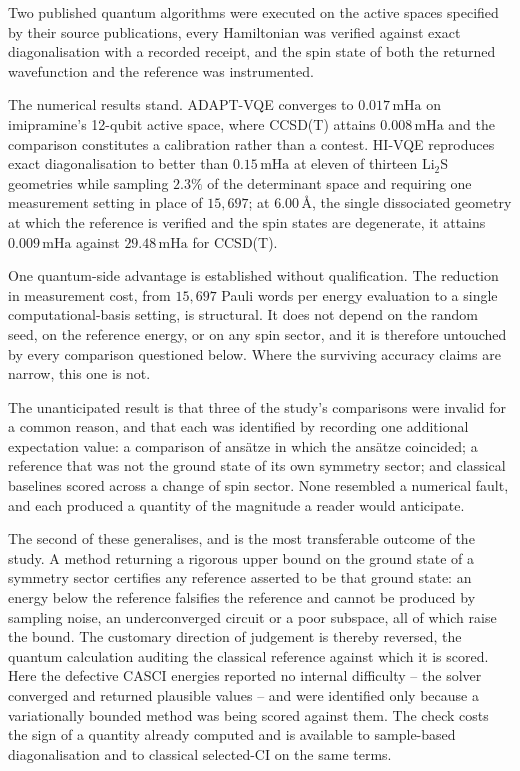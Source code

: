 \documentclass[11pt,a4paper]{article}
\newcommand{\mHa}{\ensuremath{\,\mathrm{mHa}}}
\newcommand{\Ang}{\ensuremath{\,\text{\AA}}}
\newcommand{\LiS}{\texorpdfstring{Li$_2$S}{Li2S}}
\begin{document}
Two published quantum algorithms were executed on the active spaces specified
by their source publications, every Hamiltonian was verified against exact
diagonalisation with a recorded receipt, and the spin state of both the
returned wavefunction and the reference was instrumented.

The numerical results stand. ADAPT-VQE converges to $0.017\mHa$ on imipramine's
12-qubit active space, where CCSD(T) attains $0.008\mHa$ and the comparison
constitutes a calibration rather than a contest. HI-VQE reproduces exact
diagonalisation to better than $0.15\mHa$ at eleven of thirteen \LiS{}
geometries while sampling $2.3\%$ of the determinant space and requiring one
measurement setting in place of $15{,}697$; at $6.00\Ang$, the single
dissociated geometry at which the reference is verified and the spin states are
degenerate, it attains $0.009\mHa$ against $29.48\mHa$ for CCSD(T).

One quantum-side advantage is established without qualification. The reduction
in measurement cost, from $15{,}697$ Pauli words per energy evaluation to a
single computational-basis setting, is structural. It does not depend on the
random seed, on the reference energy, or on any spin sector, and it is
therefore untouched by every comparison questioned below. Where the surviving
accuracy claims are narrow, this one is not.

The unanticipated result is that three of the study's comparisons were invalid
for a common reason, and that each was identified by recording one additional
expectation value: a comparison of ansätze in which the ansätze coincided; a
reference that was not the ground state of its own symmetry sector; and
classical baselines scored across a change of spin sector. None resembled a
numerical fault, and each produced a quantity of the magnitude a reader would
anticipate.

The second of these generalises, and is the most transferable outcome of the
study. A method returning a rigorous upper bound on the ground state of a
symmetry sector certifies any reference asserted to be that ground state: an
energy below the reference falsifies the reference and cannot be produced by
sampling noise, an underconverged circuit or a poor subspace, all of which
raise the bound. The customary direction of judgement is thereby reversed, the
quantum calculation auditing the classical reference against which it is
scored. Here the defective CASCI energies reported no internal difficulty --
the solver converged and returned plausible values -- and were identified only
because a variationally bounded method was being scored against them. The check
costs the sign of a quantity already computed and is available to
sample-based diagonalisation and to classical selected-CI on the same terms.
\end{document}
